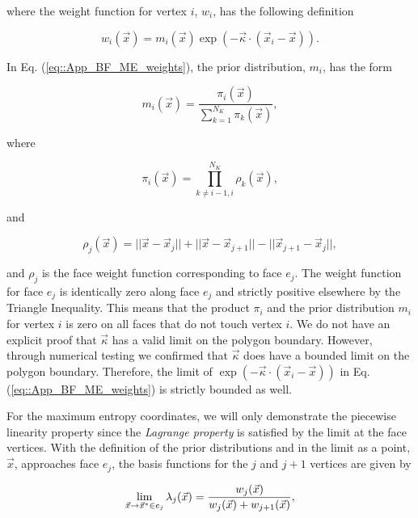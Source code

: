 \noindent where the weight function for vertex $i$, $w_i$, has the following definition

\begin{equation}
\label{eq::App_BF_ME_weights}
w_i (\vec{x})  = m_i(\vec{x}) \exp(-  \vec{\kappa} \cdot (\vec{x}_i - \vec{x})).
\end{equation}

\noindent In Eq. (\ref{eq::App_BF_ME_weights}), the prior distribution, $m_i$, has the form 

\begin{equation}
\label{eq::BF_ME_prior_funcs}
 m_i(\vec{x}) = \frac{\pi_i (\vec{x}) }{\sum\limits_{k=1}^{N_K} \pi_k (\vec{x})},
\end{equation}

\noindent where

\begin{equation}
\label{eq::BF_ME_prior_products}
\pi_i (\vec{x}) = \prod\limits_{k \neq i-1, i}^{N_K} \rho_k (\vec{x}),
\end{equation}

\noindent and

\begin{equation}
\label{eq::BF_ME_face_funcs}
\rho_j (\vec{x}) = || \vec{x} - \vec{x}_j || + || \vec{x} - \vec{x}_{j+1} || - || \vec{x}_{j+1} - \vec{x}_j || ,
\end{equation}

\noindent and $\rho_j$ is the face weight function corresponding to face $e_j$. The weight function for face $e_j$ is identically zero along face $e_j$ and strictly positive elsewhere by the Triangle Inequality. This means that the product $\pi_i$ and the prior distribution $ m_i$ for vertex $i$ is zero on all faces that do not touch vertex $i$. We do not have an explicit proof that $\vec{\kappa}$ has a valid limit on the polygon boundary. However, through numerical testing we confirmed that $\vec{\kappa}$ does have a bounded limit on the polygon boundary. Therefore, the limit of $\exp(-  \vec{\kappa} \cdot (\vec{x}_i - \vec{x}))$ in Eq. (\ref{eq::App_BF_ME_weights}) is strictly bounded as well.

For the maximum entropy coordinates, we will only demonstrate the piecewise linearity property since the {\em Lagrange property} is satisfied by the limit at the face vertices. With the definition of the prior distributions and in the limit as a point, $\vec{x}$, approaches face $e_j$, the basis functions for the $j$ and $j+1$ vertices are given by

\begin{equation}
\label{eq::App_BF_MEBF_j}
\lim\displaylimits_{\vec{x} \rightarrow \vec{x}^* \in e_j} \lambda_{j} (\vec{x}) = \frac{w_j  (\vec{x}) }{w_j  (\vec{x}) +w_{j+1}  (\vec{x}) },
\end{equation}

